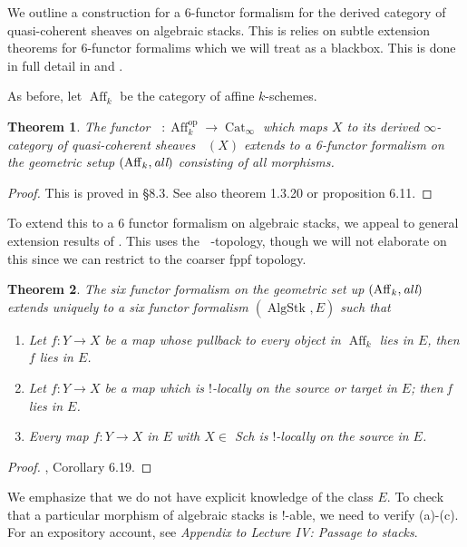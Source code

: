\documentclass{article}
\newtheorem{theorem}{Theorem}[section]
\theoremstyle{definition}
\theoremstyle{remark}
\DeclareMathOperator{\cat}{Cat}
\DeclareMathOperator{\dqc}{D_{qc}}
\DeclareMathOperator{\aff}{Aff}
\DeclareMathOperator{\algstk}{AlgStk}
\DeclareMathOperator{\op}{op}
\begin{document}
We outline a construction for a 6-functor formalism for the derived category of quasi-coherent sheaves on algebraic stacks. This is relies on subtle extension theorems for 6-functor formalims which we will treat as a blackbox. This is done in full detail in \cite{Rod25} and \cite{Rib24}.

\smallskip

As before, let $\aff_k$ be the category of affine $k$-schemes.

\begin{theorem} The functor $\dqc: \aff_k^{\op} \to \cat_{\infty}$ which maps $X$ to its derived $\infty$-category of quasi-coherent sheaves $\dqc(X)$ extends to a 6-functor formalism on the geometric setup $(\aff_k, \emph{all})$ consisting of all morphisms. 
\end{theorem}

\begin{proof} This is proved in \cite{Sch22} \S 8.3. See also \cite{Rib24} theorem 1.3.20 or \cite{Rod25} proposition 6.11.
\end{proof}

To extend this to a 6 functor formalism on algebraic stacks, we appeal to general extension results of \cite{HM24}. This uses the $\dqc$-topology, though we will not elaborate on this since we can restrict to the coarser fppf topology.

\begin{theorem} The six functor formalism on the geometric set up $(\aff_k, \emph{all})$ extends uniquely to a six functor formalism $(\algstk_{\dqc}, E)$ such that
\begin{enumerate}
  \item Let $f : Y \to X$ be a map whose pullback to every object in $\aff_k$ lies in $E$, then $f$ lies in $E$.
  \item Let $f: Y \to X$ be a map which is $!$-locally on the source or target in $E$; then f lies in $E$.
  \item Every map $f: Y \to X$ in $E$ with $X \in $ Sch is $!$-locally on the source in $E$.
\end{enumerate}
\end{theorem}
\begin{proof}
\cite{Rod25}, Corollary 6.19.
\end{proof}

We emphasize that we do not have explicit knowledge of the class $E$. To check that a particular morphism of algebraic stacks is $!$-able, we need to verify (a)-(c). For an expository account, see \cite{Sch22} \emph{Appendix to Lecture IV: Passage to stacks}. 
\end{document}
